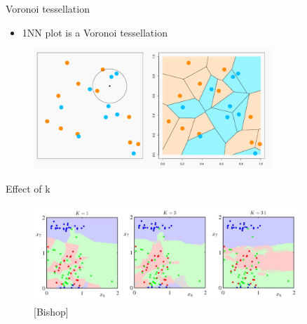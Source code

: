 \documentclass[serif, aspectratio=169]{beamer}
\begin{document}
\begin{frame}{Voronoi tessellation}
    \begin{itemize}
        \item 1NN plot is a Voronoi tessellation
    \end{itemize}
    
    \begin{figure}[h]
            \centering
            
            \includegraphics[width=0.8\textwidth]{pic/1NNVoronoi.png}
            \end{figure}
\end{frame}
\begin{frame}{Effect of k}
    \begin{figure}[h]
            \centering
            
            \includegraphics[width=0.9\textwidth]{pic/effectOfK.png}
            \caption* { \scriptsize [Bishop]}
            \end{figure}
\end{frame}
\end{document}
